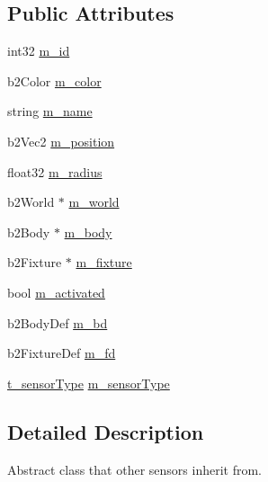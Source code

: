 \subsection*{Public Attributes}
\begin{DoxyCompactItemize}
\item 
int32 \hyperlink{classContactSensor_a589d2cd988b8d36a339394688d892df7}{m\-\_\-id}
\item 
b2\-Color \hyperlink{classContactSensor_aad27d7430ca3e8eed90f2b8b2ad849a0}{m\-\_\-color}
\item 
string \hyperlink{classContactSensor_a2cf99d03fe5bbe0773deae4a8edc4069}{m\-\_\-name}
\item 
b2\-Vec2 \hyperlink{classContactSensor_a43e68faeea764d1853eadea254ff1243}{m\-\_\-position}
\item 
float32 \hyperlink{classContactSensor_a84888f5dcbd630bd540ef314f3a22788}{m\-\_\-radius}
\item 
b2\-World $\ast$ \hyperlink{classContactSensor_a9822df2b2841440f6b5df422b017a239}{m\-\_\-world}
\item 
b2\-Body $\ast$ \hyperlink{classContactSensor_a654138f53967d7e8032f400d0e338bf5}{m\-\_\-body}
\item 
b2\-Fixture $\ast$ \hyperlink{classContactSensor_a03f59d947407b58ebce06fb3a3490633}{m\-\_\-fixture}
\item 
bool \hyperlink{classContactSensor_a79763d691af5d562d9039bfef94701b3}{m\-\_\-activated}
\item 
b2\-Body\-Def \hyperlink{classContactSensor_add4009daee3f48e71b16f6e66bdb8b32}{m\-\_\-bd}
\item 
b2\-Fixture\-Def \hyperlink{classContactSensor_a1bdedd0c81bdea57ab917320dbd9b8f2}{m\-\_\-fd}
\item 
\hyperlink{Sensors_8h_a4e6d557e949865ee922fadfafd5ed0ba}{t\-\_\-sensor\-Type} \hyperlink{classContactSensor_a9249ca2f4872b431a7c78e1fba9ccb4a}{m\-\_\-sensor\-Type}
\end{DoxyCompactItemize}


\subsection{Detailed Description}
Abstract class that other sensors inherit from. 

